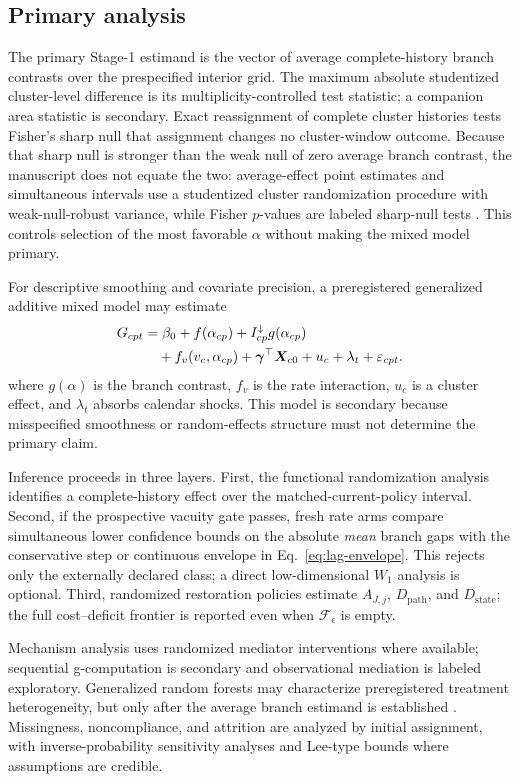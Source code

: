 \documentclass[10pt,a4paper]{article}
\begin{document}
\subsection{Primary analysis}

The primary Stage-1 estimand is the vector of average complete-history branch contrasts over the prespecified interior grid. The maximum absolute studentized cluster-level difference is its multiplicity-controlled test statistic; a companion area statistic is secondary. Exact reassignment of complete cluster histories tests Fisher's sharp null that assignment changes no cluster-window outcome. Because that sharp null is stronger than the weak null of zero average branch contrast, the manuscript does not equate the two: average-effect point estimates and simultaneous intervals use a studentized cluster randomization procedure with weak-null-robust variance, while Fisher $p$-values are labeled sharp-null tests \cite{wu2021randomization}. This controls selection of the most favorable $\alpha$ without making the mixed model primary.

For descriptive smoothing and covariate precision, a preregistered generalized additive mixed model may estimate
\begin{align}
G_{cpt}
  &=\beta_0+f(\alpha_{cp})+I_{cp}^{\downarrow}g(\alpha_{cp}) \notag\\
  &\quad +f_v(v_c,\alpha_{cp})+\bm\gamma^\top\bm X_{c0}
  +u_c+\lambda_t+\varepsilon_{cpt}.
\end{align}
where $g(\alpha)$ is the branch contrast, $f_v$ is the rate interaction, $u_c$ is a cluster effect, and $\lambda_t$ absorbs calendar shocks. This model is secondary because misspecified smoothness or random-effects structure must not determine the primary claim.

Inference proceeds in three layers. First, the functional randomization analysis identifies a complete-history effect over the matched-current-policy interval. Second, if the prospective vacuity gate passes, fresh rate arms compare simultaneous lower confidence bounds on the absolute \emph{mean} branch gaps with the conservative step or continuous envelope in Eq.~\eqref{eq:lag-envelope}. This rejects only the externally declared class; a direct low-dimensional $W_1$ analysis is optional. Third, randomized restoration policies estimate $A_{J,j}$, $D_{\mathrm{path}}$, and $D_{\mathrm{state}}$; the full cost--deficit frontier is reported even when $\mathcal F_\epsilon$ is empty.

Mechanism analysis uses randomized mediator interventions where available; sequential g-computation is secondary and observational mediation is labeled exploratory. Generalized random forests may characterize preregistered treatment heterogeneity, but only after the average branch estimand is established \cite{athey2019forests}. Missingness, noncompliance, and attrition are analyzed by initial assignment, with inverse-probability sensitivity analyses and Lee-type bounds where assumptions are credible.
\end{document}

